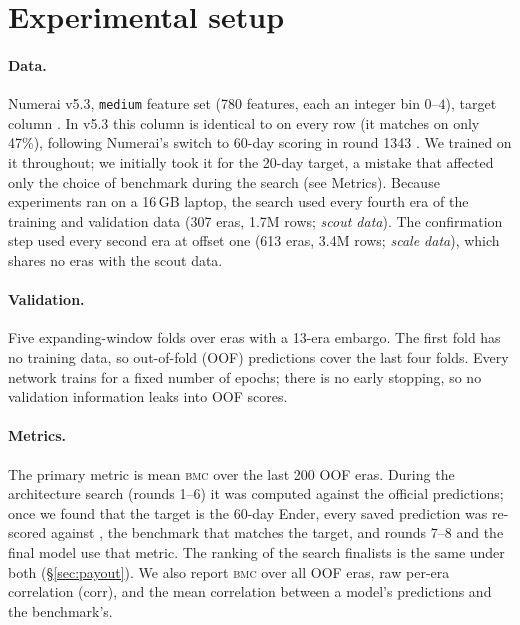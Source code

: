 \documentclass[11pt]{article}
\newcommand{\bmc}{\textsc{bmc}}
\begin{document}
\section{Experimental setup}

\paragraph{Data.} Numerai v5.3, \texttt{medium} feature set (780 features, each an integer bin
$0$--$4$), target column . In v5.3 this column is identical to
 on every row (it matches  on only 47\%), following
Numerai's switch to 60-day scoring in round 1343 \citep{numerai_scoring}. We trained on it
throughout; we initially took it for the 20-day target, a mistake that affected only the choice
of benchmark during the search (see Metrics). Because experiments ran on a 16\,GB laptop, the
search used every fourth era of the training and validation data (307 eras, 1.7M rows;
\emph{scout data}). The confirmation step used every second era at offset one (613 eras, 3.4M
rows; \emph{scale data}), which shares no eras with the scout data.

\paragraph{Validation.} Five expanding-window folds over eras with a 13-era embargo. The first
fold has no training data, so out-of-fold (OOF) predictions cover the last four folds. Every
network trains for a fixed number of epochs; there is no early stopping, so no validation
information leaks into OOF scores.

\paragraph{Metrics.} The primary metric is mean \bmc{} over the last 200 OOF eras. During the
architecture search (rounds 1--6) it was computed against the official
 predictions; once we found that the target is the 60-day Ender, every
saved prediction was re-scored against , the benchmark that matches the
target, and rounds 7--8 and the final model use that metric. The ranking of the search
finalists is the same under both (\S\ref{sec:payout}). We also report \bmc{} over all OOF eras,
raw per-era correlation (corr), and the mean correlation between a model's predictions and the
benchmark's.
\end{document}
